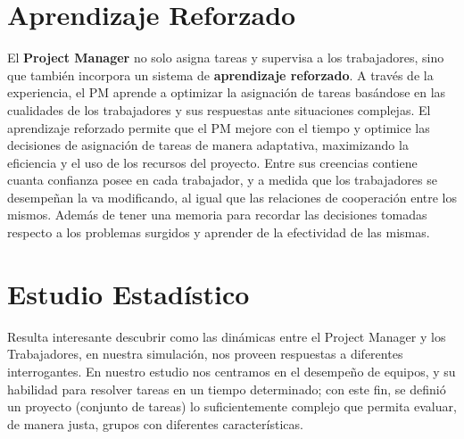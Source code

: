 \documentclass[a4paper, 12pt]{article}
\begin{document}
\section{Aprendizaje Reforzado}
El \textbf{Project Manager} no solo asigna tareas y supervisa a los trabajadores, sino que también incorpora un sistema de \textbf{aprendizaje reforzado}. A través de la experiencia, el PM aprende a optimizar la asignación de tareas basándose en las cualidades de los trabajadores y sus respuestas ante situaciones complejas. El aprendizaje reforzado permite que el PM mejore con el tiempo y optimice las decisiones de asignación de tareas de manera adaptativa, maximizando la eficiencia y el uso de los recursos del proyecto. Entre sus creencias contiene cuanta confianza posee en cada trabajador, y a medida que los trabajadores se desempeñan la va modificando, al igual que las relaciones de cooperación entre los mismos. Además de tener una memoria para recordar las decisiones tomadas respecto a los problemas surgidos y aprender de la efectividad de las mismas.

\section{Estudio Estad\'istico}
Resulta interesante descubrir como las dinámicas entre el Project Manager y los Trabajadores, en nuestra simulación, nos proveen respuestas a diferentes interrogantes. En nuestro estudio nos centramos en el desempeño de equipos, y su habilidad para resolver tareas en un tiempo determinado; con este fin, se definió un proyecto (conjunto de tareas) lo suficientemente complejo que permita evaluar, de manera justa, grupos con diferentes características.
\end{document}
